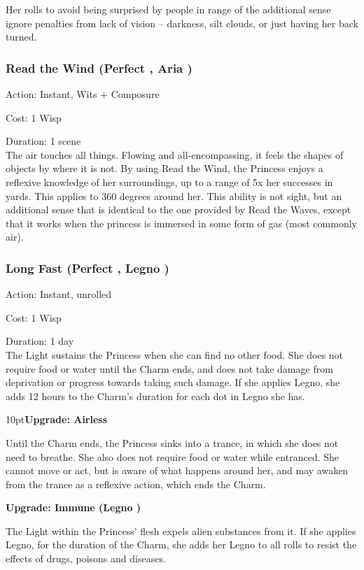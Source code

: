 Her rolls to avoid being surprised by people in range of the additional sense ignore penalties from lack of vision -- darkness, silt clouds, or just having her back turned.

\subsubsection*{Read the Wind (Perfect \textbullet, Aria \textbullet)}

\noindent Action: Instant, Wits + Composure

\noindent Cost: 1 Wisp

\noindent Duration: 1 scene \\

\noindent The air touches all things. Flowing and all-encompassing, it feels the shapes of objects by where it is not. By using Read the Wind, the Princess enjoys a reflexive knowledge of her surroundings, up to a range of 5x her successes in yards. This applies to 360 degrees around her. This ability is not sight, but an additional sense that is identical to the one provided by Read the Waves, except that it works when the princess is immersed in some form of gas (most commonly air). 

\subsubsection*{Long Fast (Perfect \textbullet, Legno \textbullet)}

\noindent Action: Instant, unrolled

\noindent Cost: 1 Wisp

\noindent Duration: 1 day \\

\noindent The Light sustains the Princess when she can find no other food. She does not require food or water until the Charm ends, and does not take damage from deprivation or progress towards taking such damage. If she applies Legno, she adds 12 hours to the Charm's duration for each dot in Legno she has.

\begin{myindentpar}{10pt}\textbf{Upgrade: Airless}

Until the Charm ends, the Princess sinks into a trance, in which she does not need to breathe. She also does not require food or water while entranced. She cannot move or act, but is aware of what happens around her, and may awaken from the trance as a reflexive action, which ends the Charm.

\textbf{Upgrade: Immune (Legno \textbullet\textbullet)}

The Light within the Princess' flesh expels alien substances from it. If she applies Legno, for the duration of the Charm, she adds her Legno to all rolls to resist the effects of drugs, poisons and diseases.\end{myindentpar}

